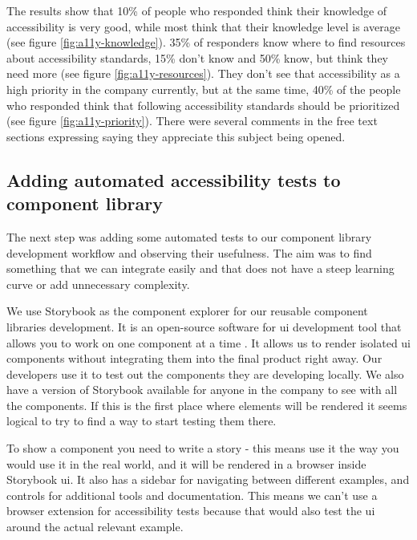 \documentclass{master_thesis}
\begin{document}
The results show that 10\% of people who responded think their knowledge of accessibility is very good, while most think that their knowledge level is average (see figure \ref{fig:a11y-knowledge}). 35\% of responders know where to find resources about accessibility standards, 15\% don't know and 50\% know, but think they need more (see figure \ref{fig:a11y-resources}). They don't see that accessibility as a high priority in the company currently, but at the same time, 40\% of the people who responded think that following accessibility standards should be prioritized (see figure \ref{fig:a11y-priority}). There were several comments in the free text sections expressing saying they appreciate this subject being opened.

\subsection{Adding automated accessibility tests to component library}
The next step was adding some automated tests to our component library development workflow and observing their usefulness. The aim was to find something that we can integrate easily and that does not have a steep learning curve or add unnecessary complexity.

We use Storybook as the component explorer for our reusable component libraries development. It is an open-source software for \ac{ui} development tool that allows you to work on one component at a time \citep{storybook}. It allows us to render isolated \ac{ui} components without integrating them into the final product right away. Our developers use it to test out the components they are developing locally. We also have a version of Storybook available for anyone in the company to see with all the components. If this is the first place where elements will be rendered it seems logical to try to find a way to start testing them there.

To show a component you need to write a story - this means use it the way you would use it in the real world, and it will be rendered in a browser inside Storybook \ac{ui}. It also has a sidebar for navigating between different examples, and controls for additional tools and documentation. This means we can't use a browser extension for accessibility tests because that would also test the \ac{ui} around the actual relevant example.
\end{document}
